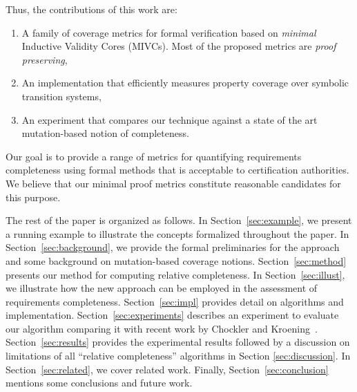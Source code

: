 Thus, the contributions of this work are:
\begin{enumerate}
\item A family of coverage metrics for formal verification based on \emph{minimal} Inductive Validity Cores (MIVCs).  Most of the proposed metrics are {\em proof preserving},
\item An implementation that efficiently measures property coverage over symbolic transition systems,
\item An experiment that compares our technique against a state of the art mutation-based notion of completeness.
\end{enumerate}

\noindent Our goal is to provide a range of metrics for quantifying requirements completeness using formal methods that is acceptable to certification authorities.  We believe that our minimal proof metrics constitute reasonable candidates for this purpose.


The rest of the paper is organized as follows.  In Section~\ref{sec:example}, we present a running example to illustrate the concepts formalized throughout the paper.  In Section~\ref{sec:background}, we provide the formal preliminaries for the approach and some background on mutation-based coverage notions.  Section~\ref{sec:method} presents our method for computing relative completeness.
In Section~\ref{sec:illust}, we illustrate how the new approach can be employed in the assessment of requirements completeness.
Section~\ref{sec:impl} provides detail on algorithms and implementation. Section~\ref{sec:experiments} describes an experiment to evaluate our algorithm comparing it with recent work by Chockler and Kroening~\cite{chockler2010coverage}.
Section~\ref{sec:results} provides the experimental results followed by a discussion on limitations of all ``relative completeness'' algorithms in Section \ref{sec:discussion}.  In Section~\ref{sec:related}, we cover related work.  Finally, Section~\ref{sec:conclusion} mentions some conclusions and future work.

